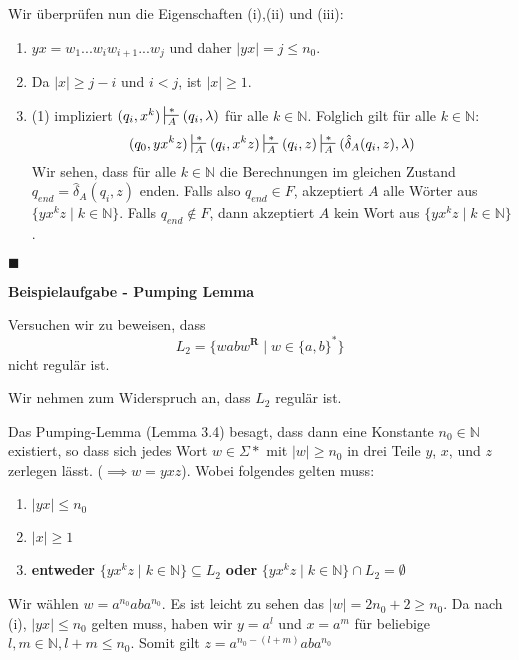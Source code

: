 \documentclass[a4paper, 11pt]{article}
\def\N{\mathbb{N}}
\newcommand\myTitle[1]{{\large \textbf {#1}}}
\begin{document}
    Wir überprüfen nun die Eigenschaften (i),(ii) und (iii):
    \begin{enumerate}[label = (\roman*)]
        \item $yx = w_1...w_iw_{i+1}...w_j$ und daher $|yx| = j \leq n_0$.
        \item Da $|x| \geq j-i$ und $i < j$, ist $|x| \geq 1$.
        \item (1) impliziert $(q_i, x^k) \sststile{A}{*} (q_i, \lambda)$ für alle $k \in \N$.
        Folglich gilt für alle $k \in \N$:
        $$(q_0, yx^kz) \sststile{A}{*} (q_i, x^kz) \sststile{A}{*} (q_i, z) \sststile{A}{*} (\hat{\delta}_A(q_i, z), \lambda)$$
        Wir sehen, dass für alle $k \in \N$ die Berechnungen im gleichen Zustand $q_{end} = \hat{\delta}_A(q_i, z)$ enden. Falls also $q_{end} \in F$, akzeptiert $A$ alle Wörter aus $\{yx^kz \mid k \in \N\}$. Falls $q_{end}\notin F$, dann akzeptiert $A$ kein Wort aus $\{yx^kz \mid k \in \N\}$.
    \end{enumerate}
    \hspace*{0pt}\hfill$\blacksquare$



    \myTitle{Beispielaufgabe - Pumping Lemma}

    Versuchen wir zu beweisen, dass 
    $$L_2 = \{wabw^{\textbf{R}} \mid w \in \{a,b\}^*\}$$
    nicht regulär ist.

    Wir nehmen zum Widerspruch an, dass $L_2$ regulär ist. 

Das Pumping-Lemma (Lemma 3.4) besagt, dass dann eine Konstante $n_0 \in \mathbb{N}$ existiert, so dass sich jedes Wort $w \in \Sigma*$ mit $|w| \geq n_0$ in drei Teile $y$, $x$, und $z$ zerlegen lässt. ($\implies w = yxz$). Wobei folgendes gelten muss:
\begin{enumerate}[label=(\roman*)]
    \item  $|yx| \leq n_0$
    \item $|x| \geq 1$
    \item \textbf{entweder} $\{yx^kz \mid k \in \mathbb{N} \} \subseteq L_2$ \textbf{oder} $\{yx^kz \mid k \in \mathbb{N} \} \cap L_2 = \emptyset$
\end{enumerate}

    Wir wählen $w = a^{n_0}aba^{n_0}$. Es ist leicht zu sehen das $|w| = 2n_0 + 2 \geq n_0$. \newline \newline
Da nach (i), $|yx| \leq n_0$ gelten muss, haben wir $y=a^l$ und $x=a^m$ für beliebige $l,m \in \N, l+m \leq n_0$. 
\newline 
Somit gilt $z = a^{n_0 - (l+m)}aba^{n_0}$
\end{document}
